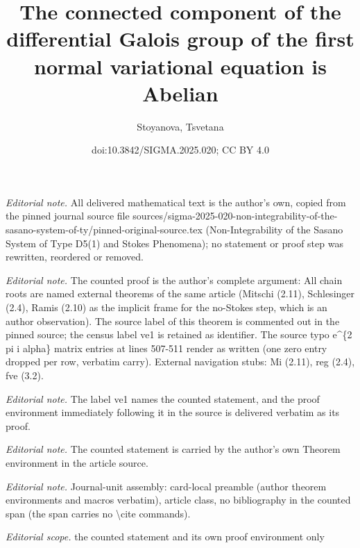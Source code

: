 \documentclass[10pt,a4paper]{article}
\title{The connected component of the differential Galois group of the first normal variational equation is Abelian}
\author{Stoyanova, Tsvetana}
\date{doi:10.3842/SIGMA.2025.020; CC BY 4.0}
\numberwithin{equation}{section}
\begin{document}
\maketitle
\setcounter{section}{3}
\setcounter{Theorem}{0}
\noindent\textit{Editorial note.} All delivered mathematical text is the author's own, copied from the pinned journal source file sources/sigma-2025-020-non-integrability-of-the-sasano-system-of-ty/pinned-original-source.tex (Non-Integrability of the Sasano System of Type D5(1) and Stokes Phenomena); no statement or proof step was rewritten, reordered or removed.\par\medskip
\noindent\textit{Editorial note.} The counted proof is the author's complete argument: All chain roots are named external theorems of the same article (Mitschi (2.11), Schlesinger (2.4), Ramis (2.10) as the implicit frame for the no-Stokes step, which is an author observation). The source label of this theorem is commented out in the pinned source; the census label ve1 is retained as identifier. The source typo e\textasciicircum{}\{2 pi i alpha\} matrix entries at lines 507-511 render as written (one zero entry dropped per row, verbatim carry). External navigation stubs: Mi (2.11), reg (2.4), fve (3.2).\par\medskip
\noindent\textit{Editorial note.} The label ve1 names the counted statement, and the proof environment immediately following it in the source is delivered verbatim as its proof.\par\medskip
\noindent\textit{Editorial note.} The counted statement is carried by the author's own Theorem environment in the article source.\par\medskip
\noindent\textit{Editorial note.} Journal-unit assembly: card-local preamble (author theorem environments and macros verbatim), article class, no bibliography in the counted span (the span carries no \textbackslash{}cite commands).\par\medskip
\noindent\textit{Editorial scope.} the counted statement and its own proof environment only\par\medskip
\end{document}
